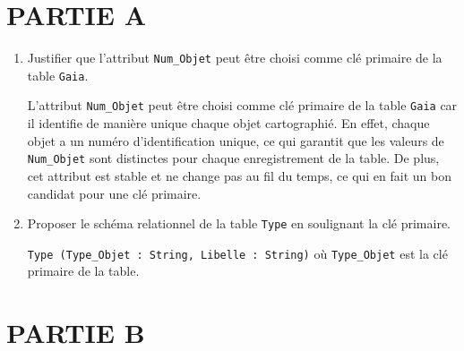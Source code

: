 

\medskip


\section*{PARTIE A}

\medskip

\begin{enumerate}[resume=monDS]
    \item Justifier que l’attribut \verb|Num_Objet| peut être choisi comme clé primaire de la table \verb|Gaia|.


\begin{blocvisible}[height=3.]
    L’attribut \verb|Num_Objet| peut être choisi comme clé primaire de la table \verb|Gaia| car il identifie de manière unique chaque objet cartographié. En effet, chaque objet a un numéro d’identification unique, ce qui garantit que les valeurs de \verb|Num_Objet| sont distinctes pour chaque enregistrement de la table. De plus, cet attribut est stable et ne change pas au fil du temps, ce qui en fait un bon candidat pour une clé primaire.
\end{blocvisible}
    \item Proposer le schéma relationnel de la table \verb|Type| en soulignant la clé primaire.

\begin{blocvisible}[height=1.3]
\verb|Type (Type_Objet : String, Libelle : String)| où \verb|Type_Objet| est la clé primaire de la table.
\end{blocvisible}
\end{enumerate}



\medskip
\thispagestyle{DS_LP}

\section*{PARTIE B}

\medskip

